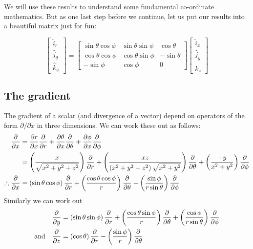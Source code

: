 \documentclass[english,seminar]{lecture}
\begin{document}
We will use these results to understand some fundamental co-ordinate mathematics. But as one last step before we continue, let us put our results into a beautiful matrix just for fun:

\[
\begin{bmatrix}
	\hat{i}_r \\ \hat{j}_\theta \\ \hat{k}_\phi
\end{bmatrix}
=
\begin{bmatrix}
	\sin\theta\cos\phi & \sin\theta\sin\phi & \cos\theta \\
	\cos\theta\cos\phi & \cos\theta\sin\phi & -\sin\theta \\
	-\sin\phi & \cos\phi & 0
\end{bmatrix}
\begin{bmatrix}
	\hat{i}_x \\ \hat{j}_y \\ \hat{k}_z
\end{bmatrix}
\]

\subsection{The gradient}
The gradient of a scalar (and divergence of a vector) depend on operators of the form $\partial/\partial x$ in three dimensions. We can work these out as follows:
\begin{align*}
{\partial\over\partial x} &= {\partial r\over\partial x}{\partial\over\partial r} + {\partial \theta \over \partial x}{\partial\over\partial \theta} + {\partial \phi \over \partial x}{\partial\over\partial \phi}\\
&= \left({x\over\sqrt{x^2+y^2+z^2}} \right){\partial\over\partial r} + \left( {xz \over \left(x^2+y^2+z^2\right) \sqrt{x^2+y^2}} \right){\partial\over\partial\theta} + \left( {-y\over x^2+y^2} \right){\partial\over\partial\phi}\\
\therefore {\partial\over\partial x} &= \left(\sin\theta\cos\phi\right){\partial\over\partial r} + \left({\cos\theta\cos\phi\over r}\right){\partial\over\partial \theta} - \left({\sin\phi\over r\sin\theta}\right){\partial\over\partial \phi}
\end{align*}
Similarly we can work out
\begin{align*}
	{\partial\over\partial y} &= \left(\sin\theta\sin\phi\right){\partial\over\partial r} + \left({\cos\theta\sin\phi\over r}\right){\partial\over\partial\theta} + \left({\cos\phi\over r\sin\theta}\right){\partial\over\partial\phi} \\
	\textrm{and} \quad {\partial\over\partial z} &= \left(\cos\theta\right){\partial\over\partial r} - \left({\sin\phi\over r}\right){\partial\over\partial\theta}
\end{align*}
\end{document}

